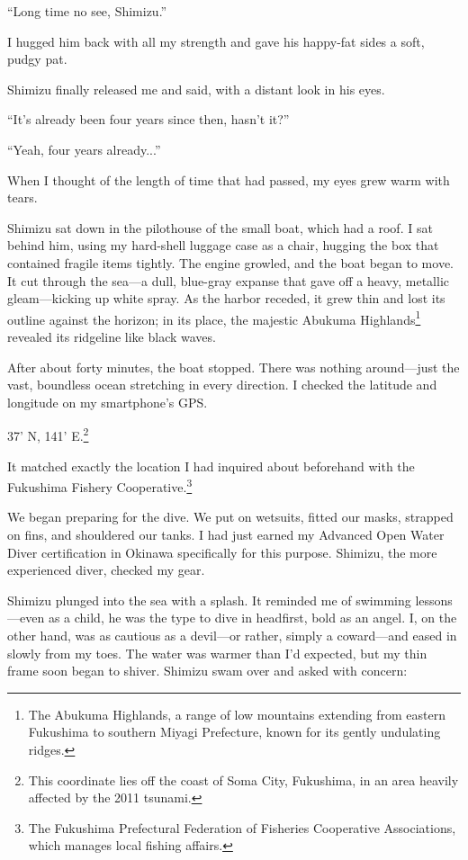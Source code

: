 \documentclass[
    a4paper,
    12pt,
    twoside,
    openany,
    UTF8,
    fontset=windows
]{ctexbook}
\begin{document}
``Long time no see, Shimizu.''

I hugged him back with all my strength and gave his happy-fat sides a soft, pudgy pat.

Shimizu finally released me and said, with a distant look in his eyes.

``It's already been four years since then, hasn't it?''

``Yeah, four years already...''

When I thought of the length of time that had passed, my eyes grew warm with tears.

Shimizu sat down in the pilothouse of the small boat, which had a roof. I sat behind him, using my hard-shell luggage case as a chair, hugging the box that contained fragile items tightly. The engine growled, and the boat began to move. It cut through the sea---a dull, blue-gray expanse that gave off a heavy, metallic gleam---kicking up white spray. As the harbor receded, it grew thin and lost its outline against the horizon; in its place, the majestic Abukuma Highlands\footnote{The Abukuma Highlands, a range of low mountains extending from eastern Fukushima to southern Miyagi Prefecture, known for its gently undulating ridges.} revealed its ridgeline like black waves.

After about forty minutes, the boat stopped. There was nothing around---just the vast, boundless ocean stretching in every direction. I checked the latitude and longitude on my smartphone's GPS.

37' N, 141' E.\footnote{This coordinate lies off the coast of Soma City, Fukushima, in an area heavily affected by the 2011 tsunami.}

It matched exactly the location I had inquired about beforehand with the Fukushima Fishery Cooperative.\footnote{The Fukushima Prefectural Federation of Fisheries Cooperative Associations, which manages local fishing affairs.}

We began preparing for the dive. We put on wetsuits, fitted our masks, strapped on fins, and shouldered our tanks. I had just earned my Advanced Open Water Diver certification in Okinawa specifically for this purpose. Shimizu, the more experienced diver, checked my gear.

Shimizu plunged into the sea with a splash. It reminded me of swimming lessons---even as a child, he was the type to dive in headfirst, bold as an angel. I, on the other hand, was as cautious as a devil---or rather, simply a coward---and eased in slowly from my toes. The water was warmer than I'd expected, but my thin frame soon began to shiver. Shimizu swam over and asked with concern:
\end{document}
